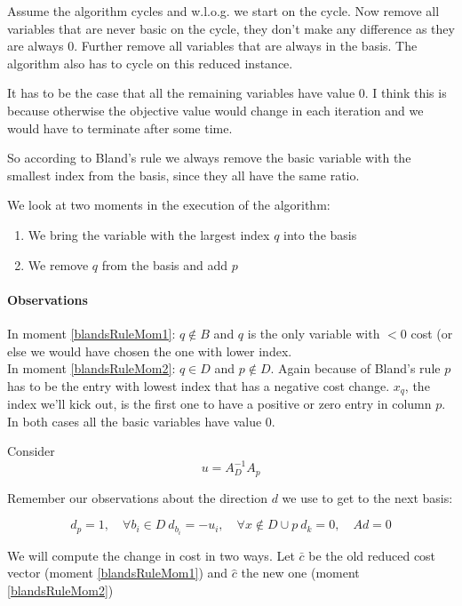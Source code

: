 \begin{pr} Assume the algorithm cycles and w.l.o.g. we start on the cycle. Now remove all variables that are never basic on the cycle, they don't make any difference as they are always 0. Further remove all variables that are always in the basis. The algorithm also has to cycle on this reduced instance. 

It has to be the case that all the remaining variables have value 0. I think this is because otherwise the objective value would change in each iteration and we would have to terminate after some time. %

So according to Bland's rule we always remove the basic variable with the smallest index from the basis, since they all have the same ratio.

We look at two moments in the execution of the algorithm:

\begin{enumerate}
\item \label{blandsRuleMom1} We bring the variable with the largest index $q$ into the basis
\item \label{blandsRuleMom2} We remove $q$ from the basis and add $p$
\end{enumerate}

\paragraph{Observations} In moment \ref{blandsRuleMom1}: $q\not \in B$ and $q$ is the only variable with $<0$ cost (or else we would have chosen the one with lower index. \\
In moment \ref{blandsRuleMom2}: $q\in D$ and $p\not \in D$. Again because of Bland's rule $p$ has to be the entry with lowest index that has a negative cost change. $x_q$, the index we'll kick out, is the first one to have a positive or zero entry in column $p$. In both cases all the basic variables have value 0. %

Consider 
\[u=A_D^{-1}A_p\]

Remember our observations about the direction $d$ we use to get to the next basis:

\[d_p =1, \quad \forall b_i \in D\ d_{b_i} = -u_i, \quad \forall x\not \in D\cup p\ d_k=0, \quad Ad=0\]

We will compute the  change in cost in two ways. Let $\bar c$ be the old reduced cost vector (moment \ref{blandsRuleMom1}) and $\hat c$ the new one (moment \ref{blandsRuleMom2})


\end{pr}
